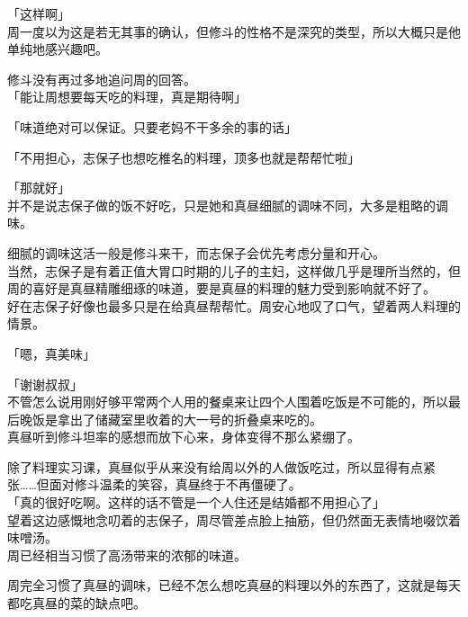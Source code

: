 「这样啊」\\

周一度以为这是若无其事的确认，但修斗的性格不是深究的类型，所以大概只是他单纯地感兴趣吧。

修斗没有再过多地追问周的回答。\\

「能让周想要每天吃的料理，真是期待啊」

「味道绝对可以保证。只要老妈不干多余的事的话」

「不用担心，志保子也想吃椎名的料理，顶多也就是帮帮忙啦」

「那就好」\\

并不是说志保子做的饭不好吃，只是她和真昼细腻的调味不同，大多是粗略的调味。

细腻的调味这活一般是修斗来干，而志保子会优先考虑分量和开心。\\

当然，志保子是有着正值大胃口时期的儿子的主妇，这样做几乎是理所当然的，但周的喜好是真昼精雕细琢的味道，要是真昼的料理的魅力受到影响就不好了。\\

好在志保子好像也最多只是在给真昼帮帮忙。周安心地叹了口气，望着两人料理的情景。\\

\vspace{2\baselineskip}

「嗯，真美味」

「谢谢叔叔」\\

不管怎么说用刚好够平常两个人用的餐桌来让四个人围着吃饭是不可能的，所以最后晚饭是拿出了储藏室里收着的大一号的折叠桌来吃的。\\

真昼听到修斗坦率的感想而放下心来，身体变得不那么紧绷了。

除了料理实习课，真昼似乎从来没有给周以外的人做饭吃过，所以显得有点紧张……但面对修斗温柔的笑容，真昼终于不再僵硬了。\\

「真的很好吃啊。这样的话不管是一个人住还是结婚都不用担心了」\\

望着这边感慨地念叨着的志保子，周尽管差点脸上抽筋，但仍然面无表情地啜饮着味噌汤。\\

周已经相当习惯了高汤带来的浓郁的味道。

周完全习惯了真昼的调味，已经不怎么想吃真昼的料理以外的东西了，这就是每天都吃真昼的菜的缺点吧。\\

